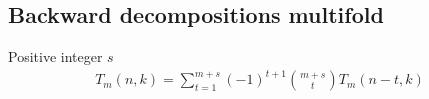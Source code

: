 ﻿\subsection{Backward decompositions multifold}\label{subsec:backward-decompositions-multifold}
\begin{proposition}
    \label{prop:Tm-recurrence-backward-multifold}
    Positive integer $s$
    \begin{align*}
        T_{m} (n, k) = \sum_{t=1}^{m+s} (-1)^{t+1} \binom{m+s}{t} T_{m} (n-t, k)
    \end{align*}
\end{proposition}
